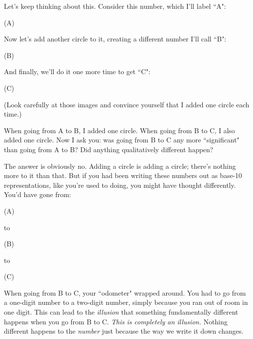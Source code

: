 Let's keep thinking about this. Consider this number, which I'll label
``A":
\begin{center}
{\large (A)} \quad\quad {}
\end{center}
Now let's add another circle to it, creating a different number I'll call
``B":
\begin{center}
{\large (B)} \quad\quad
{}
\end{center}
And finally, we'll do it one more time to get ``C":
\begin{center}
{\large (C)} \quad\quad
{}
\end{center}
(Look carefully at those images and convince yourself that I added one
circle each time.)

When going from A to B, I added one circle. When going from B to C, I also
added one circle. Now I ask you: was going from B to C any more
``significant" than going from A to B? Did anything qualitatively different
happen? 

The answer is obviously no. Adding a circle is adding a circle; there's
nothing more to it than that. But if you had been writing these numbers out
as base-10 representations, like you're used to doing, you might have
thought differently. You'd have gone from:
\begin{center}
{\large (A)} \quad\quad {}
\end{center}
to
\begin{center}
{\large (B)} \quad\quad {}
\end{center}
to
\begin{center}
{\large (C)} \quad\quad {}
\end{center}
When going from B to C, your ``odometer" wrapped around. You had to go from
a one-digit number to a two-digit number, simply because you ran out of
room in one digit. This can lead to the \textit{illusion} that something
fundamentally different happens when you go from B to C. \textit{This is
completely an illusion.} Nothing different happens to the \textit{number}
just because the way we write it down changes.

